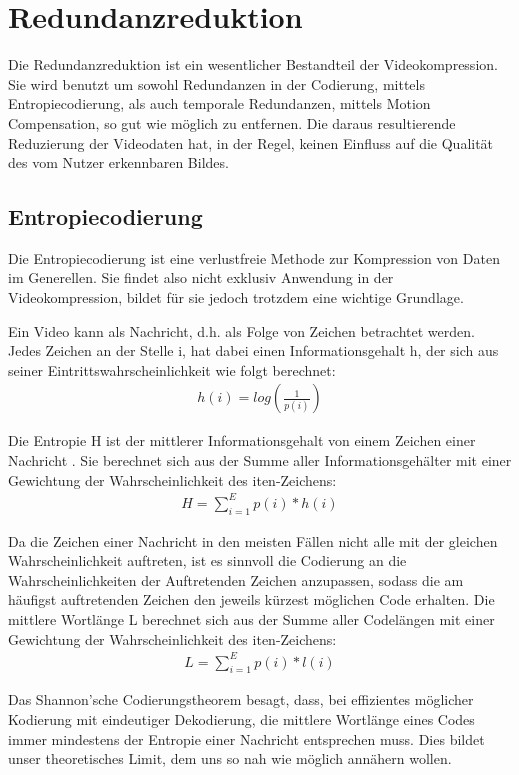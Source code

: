 \chapter{Redundanzreduktion}
\label{kap:Redundanzreduktion}

Die Redundanzreduktion ist ein wesentlicher Bestandteil der Videokompression. Sie wird benutzt um sowohl Redundanzen in der Codierung, mittels Entropiecodierung, als auch temporale Redundanzen, mittels Motion Compensation, so gut wie möglich zu entfernen. Die daraus resultierende Reduzierung der Videodaten hat, in der Regel, keinen Einfluss auf die Qualität des vom Nutzer erkennbaren Bildes.

\section{Entropiecodierung}

Die Entropiecodierung ist eine verlustfreie Methode zur Kompression von Daten im Generellen. Sie findet also nicht exklusiv Anwendung in der Videokompression, bildet für sie jedoch trotzdem eine wichtige Grundlage.

Ein Video kann als Nachricht, d.h. als Folge von Zeichen betrachtet werden. Jedes Zeichen an der Stelle i, hat dabei einen Informationsgehalt h, der sich aus seiner Eintrittswahrscheinlichkeit wie folgt berechnet:
\begin{align*}
h(i) = log(\frac{1}{p(i)})
\end{align*}

Die Entropie H ist der mittlerer Informationsgehalt von einem Zeichen einer Nachricht .
Sie berechnet sich aus der Summe aller Informationsgehälter mit einer Gewichtung der Wahrscheinlichkeit des iten-Zeichens:
\begin{align*}
H = \sum_{i=1}^E p(i) * h(i)
\end{align*}

Da die Zeichen einer Nachricht in den meisten Fällen nicht alle mit der gleichen Wahrscheinlichkeit auftreten, ist es sinnvoll die Codierung an die Wahrscheinlichkeiten der Auftretenden Zeichen anzupassen, sodass die am häufigst auftretenden Zeichen den jeweils kürzest möglichen Code erhalten.
Die mittlere Wortlänge L berechnet sich aus der Summe aller Codelängen mit einer Gewichtung der Wahrscheinlichkeit des iten-Zeichens: 
\begin{align*}
L = \sum_{i=1}^E p(i) * l(i)
\end{align*}


Das Shannon'sche Codierungstheorem besagt, dass, bei effizientes möglicher Kodierung mit eindeutiger Dekodierung, die mittlere Wortlänge eines Codes immer mindestens der Entropie einer Nachricht entsprechen muss. Dies bildet unser theoretisches Limit, dem  uns so nah wie möglich annähern wollen.

